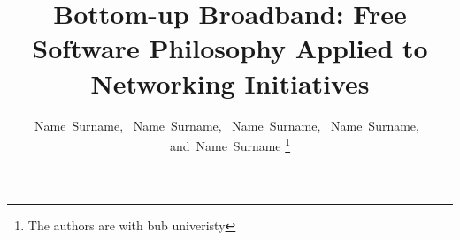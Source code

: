 \documentclass[journal]{IEEEtran}
\begin{document}
%
\title{Bottom-up Broadband: Free Software Philosophy Applied to Networking Initiatives}
%
%
%

\author{
	Name~Surname,~%
    Name~Surname,~%
    Name~Surname,~%
    Name~Surname,~%
    and~Name~Surname%
\thanks{The authors are with bub univeristy}
}


%
%



%
\end{document}

